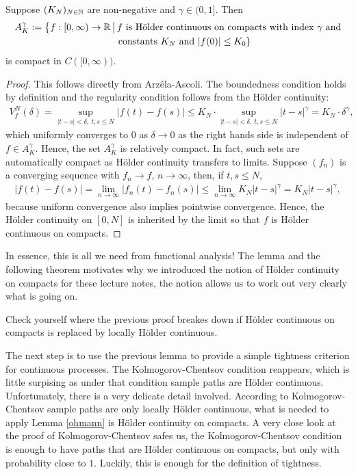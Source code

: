 \begin{laussagewerkzeug}
	\begin{lemma}\label{ohmann}
		Suppose $(K_N)_{N\in\mathbb{N}}$ are non-negative and $\gamma\in (0,1]$. Then
		\begin{align*}
			 A^\gamma_{K}
			&:=\big\{f:[0,\infty)\to \mathbb{R}\,\big|\, f\text{ is H\"older continuous on compacts with index $\gamma$ and}\\
			&\qquad\qquad\qquad \quad\qquad \text{ constants $K_N$ and } |f(0)|\leq K_0\}
		\end{align*}
		is compact in $C([0,\infty))$.
	\end{lemma}
\end{laussagewerkzeug}
\begin{proof}[Proof]
	This follows directly from Arz\'ela-Ascoli. The boundedness condition holds by definition and the regularity condition follows from the H\"older continuity:
	\begin{align*}
		V_f^N(\delta) = \sup_{\lvert t-s \rvert < \delta,\: t,s\leq N} \lvert f(t)- f(s) \rvert \leq K_N \cdot \sup_{\lvert t-s \rvert < \delta,\: t,s\leq N} \lvert t-s\rvert^{\gamma} = K_N \cdot \delta^{\gamma},
	\end{align*} 
	which uniformly converges to $0$ as $\delta\to 0$ as the right hands side is independent of $f\in A^\gamma_K$. Hence, the set $A^\gamma_K$ is relatively compact. In fact, such sets are automatically compact as H\"older continuity transfers to limits. Suppose $(f_n)$ is a converging sequence with $f_n\to f$, $n\to\infty$, then, if $t,s\leq N$,
	\begin{align}
		|f(t)-f(s)|=\lim_{n\to\infty}|f_n(t)-f_n(s)|\leq \lim_{n\to\infty} K_N|t-s|^\gamma=K_N|t-s|^\gamma,
	\end{align}
	because uniform convergence also implies pointwise convergence. Hence, the H\"older continuity on $[0,N]$ is inherited by the limit so that $f$ is H\"older continuous on compacts.
\end{proof}
In essence, this is all we need from functional analysis! The lemma and the following theorem motivates why we introduced the notion of H\"older continuity on compacts for these lecture notes, the notion allows us to work out very clearly what is going on. 
\begin{luebung}
	Check yourself where the previous proof breakes down if H\"older continuous on compacts is replaced by locally H\"older continuous.
\end{luebung}
The next step is to use the previous lemma to provide a simple tightness criterion for continuous processes. The Kolmogorov-Chentsov condition reappears, which is little surpising as under that condition sample paths are H\"older continuous. Unfortunately, there is a very delicate detail involved. According to Kolmogorov-Chentsov sample paths are only locally H\"older continuous, what is needed to apply Lemma \ref{ohmann} is H\"older continuity on compacts. A very close look at the proof of Kolmogorov-Chentsov safes us, the Kolmogorov-Chentsov condition is enough to have paths that are H\"older continuous on compacts, but only with probability close to $1$. Luckily, this is enough for the definition of tightness.
\marginpar{\textcolor{red}{Lecture 26}}

